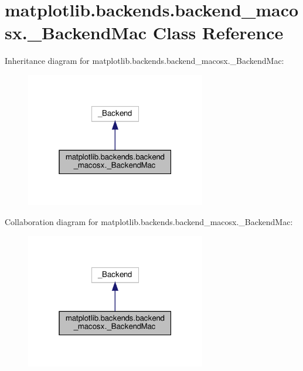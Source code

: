 \hypertarget{classmatplotlib_1_1backends_1_1backend__macosx_1_1__BackendMac}{}\section{matplotlib.\+backends.\+backend\+\_\+macosx.\+\_\+\+Backend\+Mac Class Reference}
\label{classmatplotlib_1_1backends_1_1backend__macosx_1_1__BackendMac}


Inheritance diagram for matplotlib.\+backends.\+backend\+\_\+macosx.\+\_\+\+Backend\+Mac\+:
\nopagebreak
\begin{figure}[H]
\begin{center}
\leavevmode
\includegraphics[width=223pt]{classmatplotlib_1_1backends_1_1backend__macosx_1_1__BackendMac__inherit__graph}
\end{center}
\end{figure}


Collaboration diagram for matplotlib.\+backends.\+backend\+\_\+macosx.\+\_\+\+Backend\+Mac\+:
\nopagebreak
\begin{figure}[H]
\begin{center}
\leavevmode
\includegraphics[width=223pt]{classmatplotlib_1_1backends_1_1backend__macosx_1_1__BackendMac__coll__graph}
\end{center}
\end{figure}
